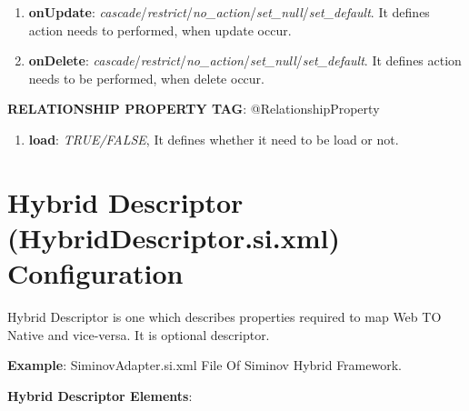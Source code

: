 \begin{enumerate}
\begin{enumerate}
			\item \small \textbf{onUpdate}: \textit{cascade}/\textit{restrict}/\textit{no\_action}/\textit{set\_null}/\textit{set\_default}. It defines action needs to performed, when update occur. 
			\item \small \textbf{onDelete}: \textit{cascade}/\textit{restrict}/\textit{no\_action}/\textit{set\_null}/\textit{set\_default}. It defines action needs to be performed, when delete occur.		

		\end{enumerate}

	\par
		\textbf{RELATIONSHIP PROPERTY TAG}: @RelationshipProperty

			\begin{enumerate}

				\item \small \textbf{load}: \textit{TRUE/FALSE}, It defines whether it need to be load or not.	

			\end{enumerate}


\end{enumerate}





\newpage
\section{Hybrid Descriptor (HybridDescriptor.si.xml) Configuration} 
	Hybrid Descriptor is one which describes properties required to map Web TO Native and vice-versa. It is optional descriptor.




\newpage
\textbf{Example}: SiminovAdapter.si.xml File Of Siminov Hybrid Framework.




\textbf{Hybrid Descriptor Elements}: 

